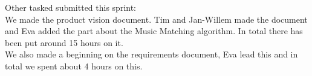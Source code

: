 \documentclass[11pt,a4paper,landscape]{article}
\begin{document}
Other tasked submitted this sprint:\\
We made the product vision document. Tim and Jan-Willem made the document and Eva added the part about the Music Matching algorithm.
In total there has been put around 15 hours on it. \\
We also made a beginning on the requirements document, Eva lead this and in total we spent about 4 hours on this.\\
\end{document}
